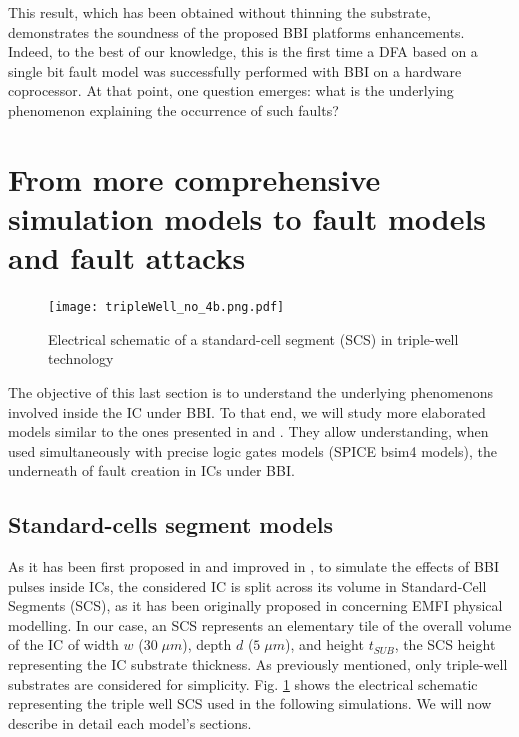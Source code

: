 \documentclass[10pt, conference, compsocconf]{IEEEtran}
\begin{document}
This result, which has been obtained without thinning the substrate, demonstrates the soundness of the proposed BBI platforms enhancements.
Indeed, to the best of our knowledge, this is the first time a DFA based on a single bit fault model was successfully performed with BBI on a hardware coprocessor.
At that point, one question emerges: what is the underlying phenomenon explaining the occurrence of such faults?

\section{From more comprehensive simulation models to fault models and fault attacks}
\label{section:attacks}

\begin{figure}[!h]
\centering
\texttt{[image: tripleWell\_no\_4b.png.pdf]}
\caption{Electrical schematic of a standard-cell segment (SCS) in triple-well technology}
\label{stdCell}
\end{figure}

The objective of this last section is to understand the underlying phenomenons involved inside the IC under BBI.
To that end, we will study more elaborated models similar to the ones presented in \cite{mybbi1} and \cite{mybbi2}.
They allow understanding, when used simultaneously with precise logic gates models (SPICE bsim4 models), the underneath of fault creation in ICs under BBI.

\subsection{Standard-cells segment models}
\label{subsection:scsModel}

As it has been first proposed in \cite{mybbi1} and improved in \cite{mybbi2}, to simulate the effects of BBI pulses inside ICs, the considered IC is split across its volume in Standard-Cell Segments (SCS), as it has been originally proposed in \cite{mathieuEMFI} concerning EMFI physical modelling.
In our case, an SCS represents an elementary tile of the overall volume of the IC of width $w$ ($30 \; \mu m$), depth $d$ ($5 \; \mu m$), and height $t_{SUB}$, the SCS height representing the IC substrate thickness.
As previously mentioned, only triple-well substrates are considered for simplicity.
Fig. \ref{stdCell} shows the electrical schematic representing the triple well SCS used in the following simulations.
We will now describe in detail each model's sections.
\end{document}

